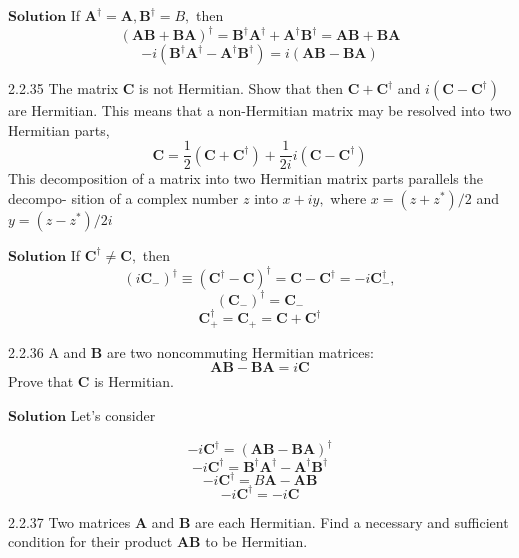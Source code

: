 \documentclass{article}
\begin{document}
\begin{flushleft}
$\boxed{\textbf{Solution}}$  If $\mathbf{A}^{\dagger}=\mathbf{A}, \mathbf{B}^{\dagger}=B,$ then
$$(\mathbf{A}\mathbf{B}+\mathbf{BA})^{\dagger}=\mathbf{B}^{\dagger} \mathbf{A}^{\dagger}+\mathbf{A}^{\dagger} \mathbf{B}^{\dagger}=\mathbf{AB}+\mathbf{BA}$$
$$-i\left(\mathbf{B}^{\dagger} \mathbf{A}^{\dagger}-\mathbf{A}^{\dagger} \mathbf{B}^{\dagger}\right)=i(\mathbf{A}\mathbf{B}-\mathbf{B}\mathbf{A})$$




\newpage


\begin{mybox}{2.2.35}
The matrix $\mathbf{C}$ is not Hermitian. Show that then $\mathbf{C}+\mathbf{C}^{\dagger}$ and $i\left(\mathbf{C}-\mathbf{C}^{\dagger}\right)$ are Hermitian.
This means that a non-Hermitian matrix may be resolved into two Hermitian parts,
$$
\mathbf{C}=\frac{1}{2}\left(\mathbf{C}+\mathbf{C}^{\dagger}\right)+\frac{1}{2 i} i\left(\mathbf{C}-\mathbf{C}^{\dagger}\right)
$$
This decomposition of a matrix into two Hermitian matrix parts parallels the decompo-
sition of a complex number $z$ into $x+i y,$ where $x=\left(z+z^{*}\right) / 2$ and $y=\left(z-z^{*}\right) / 2 i$
\end{mybox}


$\boxed{\textbf{Solution}}$ If $\mathbf{C}^{\dagger} \neq \mathbf{C},$ then 
$$\left(i \mathbf{C}_{-}\right)^{\dagger} \equiv\left(\mathbf{C}^{\dagger}-\mathbf{C}\right)^{\dagger}=\mathbf{C}-\mathbf{C}^{\dagger}=-i \mathbf{C}_{-}^{\dagger},$$
$$\left(\mathbf{C}_{-}\right)^{\dagger}=\mathbf{C}_{-}$$
$$\mathbf{C}_{+}^{\dagger}=\mathbf{C}_{+}=\mathbf{C}+\mathbf{C}^{\dagger}$$


\newpage

\begin{mybox}{2.2.36}
A and $\mathbf{B}$ are two noncommuting Hermitian matrices:
$$
\mathbf{AB}-\mathbf{B}\mathbf{A}=i \mathbf{C}
$$
Prove that $\mathbf{C}$ is Hermitian.
\end{mybox}


$\boxed{\textbf{Solution}}$ Let's consider

$$-i \mathbf{C}^{\dagger}=(\mathbf{A}\mathbf{B}-\mathbf{B}\mathbf{A})^{\dagger}$$
$$-i \mathbf{C}^{\dagger}=\mathbf{B}^{\dagger} \mathbf{A}^{\dagger}-\mathbf{A}^{\dagger} \mathbf{B}^{\dagger}$$
$$-i \mathbf{C}^{\dagger}=B \mathbf{A}-\mathbf{A}\mathbf{B}$$
$$-i \mathbf{C}^{\dagger}=-i \mathbf{C}$$

\newpage

\begin{mybox}{2.2.37}
Two matrices $\mathbf{A}$ and $\mathbf{B}$ are each Hermitian. Find a necessary and sufficient condition for
their product $\mathbf{AB}$ to be Hermitian.
\end{mybox}



\end{flushleft}
\end{document}
